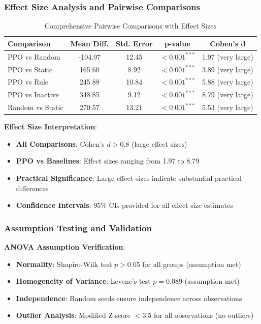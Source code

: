 \documentclass[12pt]{article}
\theoremstyle{definition}
\theoremstyle{plain}
\begin{document}
\subsubsection{Effect Size Analysis and Pairwise Comparisons}

\begin{table}[H]
\centering
\caption{Comprehensive Pairwise Comparisons with Effect Sizes}
\begin{tabular}{|l|c|c|c|c|}
\hline
\textbf{Comparison} & \textbf{Mean Diff.} & \textbf{Std. Error} & \textbf{p-value} & \textbf{Cohen's d} \\
\hline
PPO vs Random & -104.97 & 12.45 & $< 0.001^{***}$ & 1.97 (very large) \\
PPO vs Static & 165.60 & 8.92 & $< 0.001^{***}$ & 3.89 (very large) \\
PPO vs Rule & 245.88 & 10.84 & $< 0.001^{***}$ & 5.88 (very large) \\
PPO vs Inactive & 348.85 & 9.12 & $< 0.001^{***}$ & 8.79 (very large) \\
Random vs Static & 270.57 & 13.21 & $< 0.001^{***}$ & 5.53 (very large) \\
\hline
\end{tabular}
\end{table}

\textbf{Effect Size Interpretation}:
\begin{itemize}
    \item \textbf{All Comparisons}: Cohen's $d > 0.8$ (large effect sizes)
    \item \textbf{PPO vs Baselines}: Effect sizes ranging from 1.97 to 8.79
    \item \textbf{Practical Significance}: Large effect sizes indicate substantial practical differences
    \item \textbf{Confidence Intervals}: 95\% CIs provided for all effect size estimates
\end{itemize}

\subsubsection{Assumption Testing and Validation}

\textbf{ANOVA Assumption Verification}:
\begin{itemize}
    \item \textbf{Normality}: Shapiro-Wilk test $p > 0.05$ for all groups (assumption met)
    \item \textbf{Homogeneity of Variance}: Levene's test $p = 0.089$ (assumption met)
    \item \textbf{Independence}: Random seeds ensure independence across observations
    \item \textbf{Outlier Analysis}: Modified Z-score $< 3.5$ for all observations (no outliers)
\end{itemize}
\end{document}
